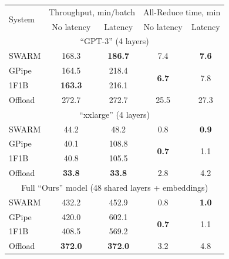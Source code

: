 \begin{table}
\centering
\small
\setlength{\tabcolsep}{4pt}
\label{tab:throughput_gpt}
\begin{tabular}[b]{lcccc}
\toprule
\multirow{2}[2]{*}{System} &
  \multicolumn{2}{c}{Throughput, min/batch} &
  \multicolumn{2}{c}{All-Reduce time, min} \\ \cmidrule(lr){2-3}\cmidrule(lr){4-5} 
                 & No latency & Latency & No latency & Latency \\
 \midrule \multicolumn{5}{c}{``GPT-3'' (4 layers) }\\
 \midrule
SWARM            &  168.3 &\textbf{186.7}  &  7.4 & \textbf{7.6}   \\
GPipe            &  164.5 & 218.4 &  \multirow{2}{*}{\textbf{6.7}}    & \multirow{2}{*}{7.8}   \\
1F1B & \textbf{163.3} & 216.1 & & \\
Offload          &  272.7 & 272.7          &  25.5 & 27.3 \\
\midrule \multicolumn{5}{c}{``xxlarge'' (4 layers) }\\
\midrule
SWARM            &  44.2 & 48.2                  &  0.8  & \textbf{0.9}   \\
GPipe            &  40.1 & 108.8                  &  \multirow{2}{*}{\textbf{0.7}}  & \multirow{2}{*}{1.1}   \\
1F1B & 40.8 & 105.5 & & \\
Offload          &  \textbf{33.8} & \textbf{33.8}  &  2.8 & 4.2   \\
\midrule \multicolumn{5}{c}{Full ``Ours'' model (48 shared layers + embeddings) }\\
\midrule
SWARM            &  432.2 & 452.9                  &  0.8  &\bf 1.0   \\
GPipe            &  420.0 & 602.1                   &  \multirow{2}{*}{\bf 0.7}  & \multirow{2}{*}{1.1}   \\
1F1B             &  408.5 & 569.2 & & \\
Offload          &  \bf 372.0 &\bf 372.0  &  3.2 & 4.8   \\
\bottomrule
\end{tabular}
\vspace{-8pt}
\end{table}%


